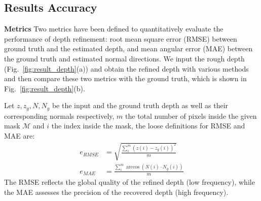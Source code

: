 \subsection{Results Accuracy}
\textbf{Metrics}
Two metrics have been defined to quantitatively evaluate the performance of depth refinement: root mean square error (RMSE) between ground truth and the estimated depth, and mean angular error (MAE) between the ground truth and estimated normal directions.
We input the rough depth (Fig.~\ref{fig:result_depth}(a)) and obtain the refined depth with various methods and then compare these two metrics with the ground truth, which is shown in Fig.~\ref{fig:result_depth}(b).

Let $z, z_g, N, N_g$ be the input and the ground truth depth as well as their corresponding normals respectively, $m$ the total number of pixels inside the given mask $\mathcal{M}$ and $i$ the index inside the mask, the loose definitions for RMSE and MAE are: 
\begin{align}
    e_{RMSE} &= \sqrt{\frac{\sum\limits_{i}^{m}{(z(i) - z_g(i))^2}}{m}}\\
    e_{MAE} &= \frac{\sum\limits_{i}^{m} \arccos (N(i) \cdot N_g(i))}{m}\label{eq:mae}
\end{align}
The RMSE reflects the global quality of the refined depth (low frequency), while the MAE assesses the precision of the recovered depth (high frequency). 

